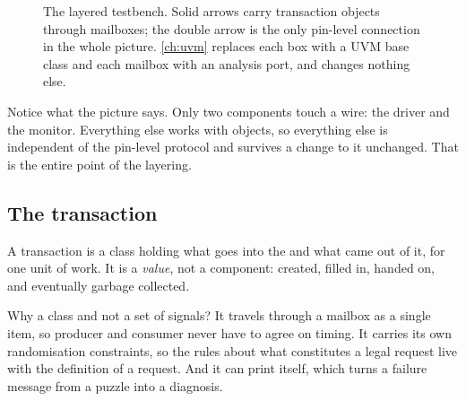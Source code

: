 \begin{figure}[htbp]
  \caption{The layered testbench. Solid arrows carry transaction objects
    through mailboxes; the double arrow is the only pin-level connection in the
    whole picture. \cref{ch:uvm} replaces each box with a UVM base class and
    each mailbox with an analysis port, and changes nothing else.}
  \label{fig:tb:layered}
\end{figure}

Notice what the picture says. Only two components touch a wire: the driver and
the monitor. Everything else works with objects, so everything else is
independent of the pin-level protocol and survives a change to it unchanged.
That is the entire point of the layering.

\subsection{The transaction}

A transaction is a class holding what goes into the \DUT{}
and what came out of it, for one unit of work. It is a \emph{value}, not a
component: created, filled in, handed on, and eventually garbage collected.

Why a class and not a set of signals? It travels through a mailbox as a single
item, so producer and consumer never have to agree on timing. It carries its
own randomisation constraints, so the rules about what constitutes a legal
request live with the definition of a request. And it can print itself, which
turns a failure message from a puzzle into a diagnosis.

